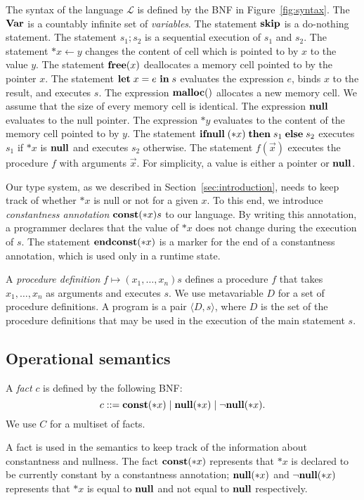 
The syntax of the language \(\mathcal{L}\) is defined by the BNF in
Figure~\ref{fig:syntax}.  The \(\mathbf{Var}\) is a countably infinite set of
\emph{variables}. The statement \(\mathbf{skip}\) is a do-nothing statement.
The statement \(s_1;s_2\) is a sequential execution of \(s_1\) and
\(s_2\). The statement \(*x \leftarrow y\) changes the content of cell
which is pointed to by \(x\) to the value \(y\). The statement
\(\mathbf{free}(x)\) deallocates a memory cell pointed to by the pointer
\(x\). The statement \(\mathbf{let}\; x = e\ \mathbf{in}\; s\) evaluates the expression
\(e\), binds \(x\) to the result, and executes \(s\).  The expression
\(\mathbf{malloc}()\) allocates a new memory cell.  We assume that the size of
every memory cell is identical.  The expression \(\mathbf{null}\) evaluates to
the null pointer.  The expression $*y$ evaluates to the content of the
memory cell pointed to by \(y\).  The statement \(\mathbf{ifnull}\;(*x) \; \mathbf{then}\; s_1
\; \mathbf{else}\; s_2\) executes \(s_1\) if \(*x\) is \(\mathbf{null}\) and executes \(s_2\)
otherwise. The statement \(f(\vec{x})\) executes the procedure \(f\)
with arguments \(\vec{x}\).  For simplicity, a value is either a pointer
or $\mathbf{null}$.

Our type system, as we described in Section~\ref{sec:introduction},
needs to keep track of whether $*x$ is null or not for a given $x$.  To
this end, we introduce \emph{constantness annotation} \(\mathbf{const}(*x) s\)
to our language.  By writing this annotation, a programmer declares that
the value of $*x$ does not change during the execution of $s$.  The
statement \(\mathbf{endconst}(*x)\) is a marker for the end of a constantness
annotation, which is used only in a runtime state.

A \emph{procedure definition} $f \mapsto (x_1,\dots,x_n)s$ defines a
procedure $f$ that takes $x_1,\dots,x_n$ as arguments and executes $s$.
We use metavariable \(D\) for a set of procedure definitions.  A program
is a pair \(\langle D, s \rangle \), where \(D\) is the set of the
procedure definitions that may be used in the execution of the main
statement $s$.

\subsection{Operational semantics}
\label{sec:languageSemantics}

\begin{myDef}
 A \emph{fact} $c$ is defined by the following BNF:
 \[
 c ::= \mathbf{const}(*x) \mid \mathbf{null}(*x) \mid \neg\mathbf{null}(*x).
 \]
 We use $C$ for a multiset of facts.
\end{myDef}
A fact is used in the semantics to keep track of the information about
constantness and nullness.  The fact \(\mathbf{const}(*x)\) represents that $*x$
is declared to be currently constant by a constantness annotation;
\(\mathbf{null}(*x)\) and \(\neg\mathbf{null}(*x)\) represents that $*x$ is equal to $\mathbf{null}$ and
not equal to $\mathbf{null}$ respectively.


